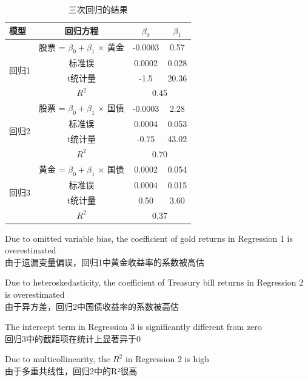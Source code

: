 \documentclass{article}
\newcounter{question} %
\begin{document}
\begin{question}
\begin{center}
\begin{table}[H]
\centering
\caption{三次回归的结果}
\begin{tabular}{lccc}
\toprule
模型 & 回归方程 & \(\beta_0\) & \(\beta_1\) \\
\midrule
\multirow{4}{*}{回归1} & 股票 = \(\beta_0 + \beta_1\) × 黄金 & -0.0003 & 0.57 \\
& 标准误 & 0.0002 & 0.028 \\
& t统计量 & -1.5 & 20.36 \\
& \(R^2\) & \multicolumn{2}{c}{0.45} \\
\midrule
\multirow{4}{*}{回归2} & 股票 = \(\beta_0 + \beta_1\) × 国债 & -0.0003 & 2.28 \\
& 标准误 & 0.0004 & 0.053 \\
& t统计量 & -0.75 & 43.02 \\
& \(R^2\) & \multicolumn{2}{c}{0.70} \\
\midrule
\multirow{4}{*}{回归3} & 黄金 = \(\beta_0 + \beta_1\) × 国债 & 0.0002 & 0.054 \\
& 标准误 & 0.0004 & 0.015 \\
& t统计量 & 0.50 & 3.60 \\
& \(R^2\) & \multicolumn{2}{c}{0.37} \\
\bottomrule
\end{tabular}
\end{table}
\end{center}
\end{question}

\begin{choices}
    \item Due to omitted variable bias, the coefficient of gold returns in Regression 1 is overestimated\\
    由于遗漏变量偏误，回归1中黄金收益率的系数被高估
    \item Due to heteroskedasticity, the coefficient of Treasury bill returns in Regression 2 is overestimated\\
    由于异方差，回归2中国债收益率的系数被高估
    \item The intercept term in Regression 3 is significantly different from zero\\
    回归3中的截距项在统计上显著异于0
    \item Due to multicollinearity, the \(R^2\) in Regression 2 is high\\
    由于多重共线性，回归2中的R²很高
\end{choices}
\end{document}
